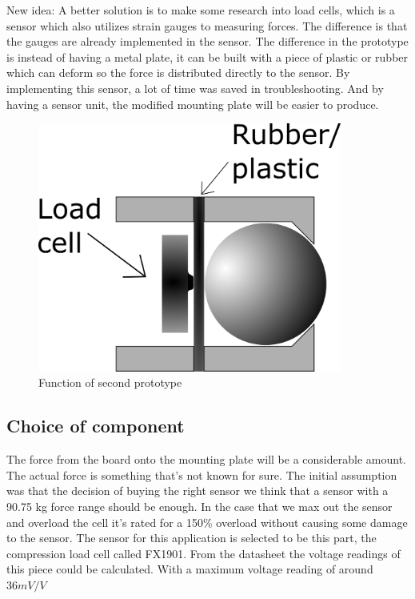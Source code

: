 New idea:
A better solution is to make some research into load cells, which is a sensor which also utilizes strain gauges to measuring forces. The difference is that the gauges are already implemented in the sensor. The difference in the prototype is instead of having a metal plate, it can be built with a piece of plastic or rubber which can deform so the force is distributed directly to the sensor. By implementing this sensor, a lot of time was saved in troubleshooting. And by having a sensor unit, the modified mounting plate will be easier to produce. 
 
\begin{figure}[H]
\begin{center}
	\includegraphics[width = 10cm]{Figures/Press_sens_func_2.png}
	\caption{Function of second prototype}
	\label{Press_sens_prot_2}
\end{center}
\end{figure}

\subsection{Choice of component}
The force from the board onto the mounting plate will be a considerable amount. The actual force is something that’s not known for sure. The initial assumption was that the decision of buying the right sensor we think that a sensor with a 90.75 kg force range should be enough. In the case that we max out the sensor and overload the cell it's rated for a 150\% overload without causing some damage to the sensor. 
The sensor for this application is selected to be this part, the compression load cell called FX1901. 
From the datasheet the voltage readings of this piece could be calculated. With a maximum voltage reading of around $36mV/V$

